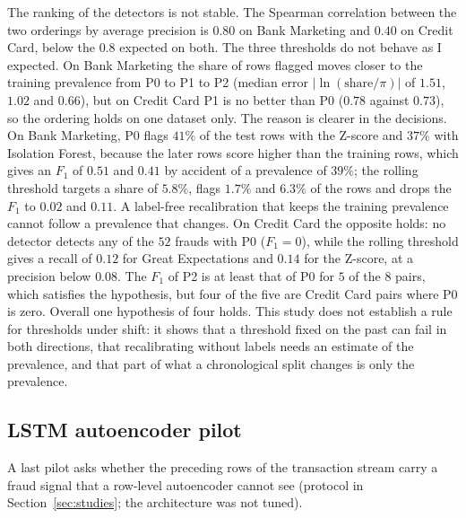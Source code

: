 \documentclass[conference]{IEEEtran}
\begin{document}
The ranking of the detectors is not stable. The Spearman correlation between
the two orderings by average precision is $0.80$ on Bank Marketing and $0.40$ on
Credit Card, below the $0.8$ expected on both. The three thresholds do not
behave as I expected. On Bank Marketing the share of rows flagged moves closer to
the training prevalence from P0 to P1 to P2 (median error
$|\ln(\text{share}/\pi)|$ of $1.51$, $1.02$ and $0.66$), but on Credit Card P1
is no better than P0 ($0.78$ against $0.73$), so the ordering holds on one
dataset only. The reason is clearer in the decisions. On Bank Marketing, P0
flags $41\%$ of the test rows with the Z-score and $37\%$ with Isolation Forest,
because the later rows score higher than the training rows, which gives an $F_1$
of $0.51$ and $0.41$ by accident of a prevalence of $39\%$; the rolling
threshold targets a share of $5.8\%$, flags $1.7\%$ and $6.3\%$ of the rows and
drops the $F_1$ to $0.02$ and $0.11$. A label-free recalibration that keeps the
training prevalence cannot follow a prevalence that changes. On Credit Card the
opposite holds: no detector detects any of the $52$ frauds with P0 ($F_1 = 0$),
while the rolling threshold gives a recall of $0.12$ for Great Expectations and
$0.14$ for the Z-score, at a precision below $0.08$. The $F_1$ of P2 is at
least that of P0 for $5$ of the $8$ pairs, which satisfies the hypothesis, but
four of the five are Credit Card pairs where P0 is zero. Overall one hypothesis of
four holds. This study does not establish a rule for thresholds under shift: it
shows that a threshold fixed on the past can fail in both directions, that
recalibrating without labels needs an estimate of the prevalence, and that part
of what a chronological split changes is only the prevalence.

\subsection{LSTM autoencoder pilot}
\label{sec:lstm}
A last pilot asks whether the preceding rows of the transaction stream carry a
fraud signal that a row-level autoencoder cannot see (protocol in
Section~\ref{sec:studies}; the architecture was not tuned).
\end{document}

